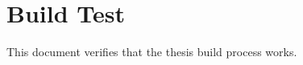 \documentclass[a4paper,12pt]{report}
\begin{document}
\chapter{Build Test}

This document verifies that the thesis build process works.
\end{document}
